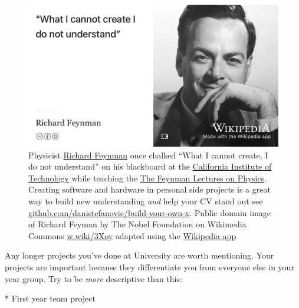 \documentclass[
]{book}
\newenvironment{Shaded}{\begin{snugshade}}{\end{snugshade}}
\newcommand{\NormalTok}[1]{#1}
\newcommand{\SpecialStringTok}[1]{\textcolor[rgb]{0.31,0.60,0.02}{#1}}
\begin{document}
\begin{figure}

{\centering \includegraphics[width=1\linewidth]{images/what-I-cannot-create-I-do-not-understand} 

}

\caption{Physicist \href{https://en.wikipedia.org/wiki/Richard_Feynman}{Richard Feynman} once chalked ``What I cannot create, I do not understand'' on his blackboard at the \href{https://en.wikipedia.org/wiki/California_Institute_of_Technology}{California Institute of Technology} while teaching the \href{https://en.wikipedia.org/wiki/The_Feynman_Lectures_on_Physics}{The Feynman Lectures on Physics}. \citep{Way2017} Creating software and hardware in personal side projects is a great way to build new understanding \emph{and} help your CV stand out see \href{https://github.com/danistefanovic/build-your-own-x}{github.com/danistefanovic/build-your-own-x}. Public domain image of Richard Feyman by The Nobel Foundation on Wikimedia Commons \href{https://w.wiki/3Xoy}{w.wiki/3Xoy} adapted using the \href{https://apps.apple.com/us/app/wikipedia/id324715238}{Wikipedia app}}\label{fig:feynman-fig}
\end{figure}



Any longer projects you've done at University are worth mentioning. Your projects are important because they differentiate you from everyone else in your year group. Try to be \emph{more} descriptive than this:

\begin{Shaded}
\begin{Highlighting}[]
\SpecialStringTok{* }\NormalTok{First year team project}
\end{Highlighting}
\end{Shaded}
\end{document}

